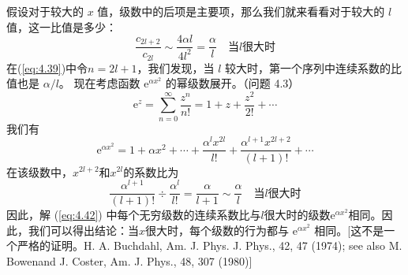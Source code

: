     假设对于较大的 $x$ 值，级数中的后项是主要项，那么我们就来看看对于较大的 $l$ 值，这一比值是多少：
    \begin{equation}
        \frac{c_{2l+2}}{c_{2l}} \sim \frac{4\alpha l}{4l^2} = \frac{\alpha}{l} \quad \text{当}l\text{很大时}
        \label{eq:4.43}
    \end{equation}
    在(\ref{eq:4.39})中令$n=2l+1$，我们发现，当 $l$ 较大时，第一个序列中连续系数的比值也是 $\alpha/l$。 现在考虑函数 $\mathrm{e}^{\alpha x^2}$ 的幂级数展开。（问题 4.3）
    \begin{equation}
        \mathrm{e}^{z} = \sum_{n=0}^{\infty}\frac{z^n}{n!} = 1 + z + \frac{z^2}{2!} + \cdots
        \label{eq:4.44}
    \end{equation}
    我们有
    \begin{equation*}
        \mathrm{e}^{\alpha x^2} = 1 + \alpha x^2 + \cdots + \frac{\alpha ^l x^{2l}}{l!} + \frac{\alpha ^{l+1} x^{2l+2}}{(l+1)!} + \cdots
    \end{equation*}
    在该级数中，$x^{2l+2}$和$x^{2l}$的系数比为
    \begin{equation*}
        \frac{\alpha^{l+1}}{\left(l+1\right)!} \div \frac{\alpha^l}{l!} = \frac{\alpha}{l+1} \sim \frac{\alpha}{l} \quad \text{当}l\text{很大时}
    \end{equation*}
    因此，解 (\ref{eq:4.42}) 中每个无穷级数的连续系数比与$l$很大时的级数$\mathrm{e}^{\alpha x^2}$相同。因此，我们可以得出结论：当$x$很大时，每个级数的行为都与 $\mathrm{e}^{\alpha x^2}$ 相同。[这不是一个严格的证明。H. A. Buchdahl, Am. J. Phys. J. Phys., 42, 47 (1974); see also M. Bowenand J. Coster, Am. J. Phys., 48, 307 (1980)]\\
